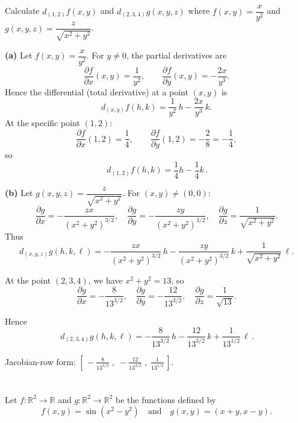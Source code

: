 \documentclass[12pt]{article}
\begin{document}
\section{}
Calculate $d_{(1,2)}f(x, y)$ and $d_{(2,3,4)}g(x, y, z)$ where $f(x, y) = \dfrac{x}{y^2}$ and $g(x, y, z) = \dfrac{z}{\sqrt{x^2 + y^2}}$.

\begin{correctionbox}
\textbf{(a)} Let \(f(x,y)=\dfrac{x}{y^2}\). For \(y\neq 0\), the partial derivatives are
\[
\frac{\partial f}{\partial x}(x,y)=\frac{1}{y^2},\qquad
\frac{\partial f}{\partial y}(x,y)=-\frac{2x}{y^3}.
\]
Hence the differential (total derivative) at a point \((x,y)\) is
\[
d_{(x,y)}f(h,k)=\frac{1}{y^2}\,h - \frac{2x}{y^3}\,k.
\]
At the specific point \((1,2)\):
\[
\frac{\partial f}{\partial x}(1,2)=\frac{1}{4},\qquad
\frac{\partial f}{\partial y}(1,2)=-\frac{2}{8}=-\frac{1}{4},
\]
so
\[
\boxed{\,d_{(1,2)}f(h,k)=\frac{1}{4}h - \frac{1}{4}k\,.}
\]

\bigskip

\textbf{(b)} Let \(g(x,y,z)=\dfrac{z}{\sqrt{x^2+y^2}}\). For \((x,y)\neq(0,0)\):
\[
\frac{\partial g}{\partial x}=-\frac{zx}{(x^2+y^2)^{3/2}},\quad
\frac{\partial g}{\partial y}=-\frac{zy}{(x^2+y^2)^{3/2}},\quad
\frac{\partial g}{\partial z}=\frac{1}{\sqrt{x^2+y^2}}.
\]
Thus
\[
d_{(x,y,z)}g(h,k,\ell)
= -\frac{zx}{(x^2+y^2)^{3/2}}\,h
- \frac{zy}{(x^2+y^2)^{3/2}}\,k
+ \frac{1}{\sqrt{x^2+y^2}}\,\ell.
\]

At the point \((2,3,4)\), we have \(x^2+y^2=13\), so
\[
\frac{\partial g}{\partial x}=-\frac{8}{13^{3/2}},\quad
\frac{\partial g}{\partial y}=-\frac{12}{13^{3/2}},\quad
\frac{\partial g}{\partial z}=\frac{1}{\sqrt{13}}.
\]

Hence
\[
\boxed{\,d_{(2,3,4)}g(h,k,\ell)
= -\frac{8}{13^{3/2}}\,h
- \frac{12}{13^{3/2}}\,k
+ \frac{1}{13^{1/2}}\,\ell\,.}
\]

Jacobian-row form: \([\, -\tfrac{8}{13^{3/2}}\;,\; -\tfrac{12}{13^{3/2}}\;,\; \tfrac{1}{13^{1/2}}\,]\).
\end{correctionbox}


\section{}
Let $f : \mathbb{R}^2 \to \mathbb{R}$ and $g : \mathbb{R}^2 \to \mathbb{R}^2$ be the functions defined by
$$f(x, y) = \sin(x^2 - y^2) \quad \text{and} \quad g(x, y) = (x + y, x - y).$$
\end{document}
